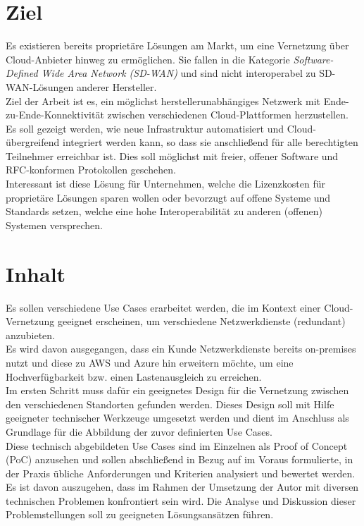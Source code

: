 \section{Ziel}

Es existieren bereits proprietäre Lösungen am Markt, um eine Vernetzung über Cloud-Anbieter hinweg zu ermöglichen. Sie fallen in die Kategorie \textit{Software-Defined Wide Area Network (SD-WAN)} und sind nicht interoperabel zu \gls{SD-WAN}-Lösungen anderer Hersteller.\\
Ziel der Arbeit ist es, ein möglichst herstellerunabhängiges Netzwerk mit Ende-zu-Ende-Konnektivität zwischen verschiedenen Cloud-Plattformen herzustellen. Es soll gezeigt werden, wie neue Infrastruktur automatisiert und Cloud-übergreifend integriert werden kann, so dass sie anschließend für alle berechtigten Teilnehmer erreichbar ist. Dies soll möglichst mit freier, offener Software und \gls{RFC}-konformen Protokollen geschehen.\\
Interessant ist diese Lösung für Unternehmen, welche die Lizenzkosten für proprietäre Lösungen sparen wollen oder bevorzugt auf offene Systeme und Standards setzen, welche eine hohe Interoperabilität zu anderen (offenen) Systemen versprechen.

\section{Inhalt}
Es sollen verschiedene Use Cases erarbeitet werden, die im Kontext einer Cloud-Vernetz\-ung geeignet erscheinen, um verschiedene Netzwerkdienste (redundant) anzubieten.\\
Es wird davon ausgegangen, dass ein Kunde Netzwerkdienste bereits \gls{on-premises} nutzt und diese zu AWS und Azure hin erweitern möchte, um eine Hochverfügbarkeit bzw. einen Lastenausgleich zu erreichen.\\
Im ersten Schritt muss dafür ein geeignetes Design für die Vernetzung zwischen den verschiedenen Standorten gefunden werden. Dieses Design soll mit Hilfe geeigneter technischer Werkzeuge umgesetzt werden und dient im Anschluss als Grundlage für die Abbildung der zuvor definierten Use Cases.\\
Diese technisch abgebildeten Use Cases sind im Einzelnen als Proof of Concept (PoC) anzusehen und sollen abschließend in Bezug auf im Voraus formulierte, in der Praxis übliche Anforderungen und Kriterien analysiert und bewertet werden. Es ist davon auszugehen, dass im Rahmen der Umsetzung der Autor mit diversen technischen Problemen konfrontiert sein wird. Die Analyse und Diskussion dieser Problemstellungen soll zu geeigneten Lösungsansätzen führen.

